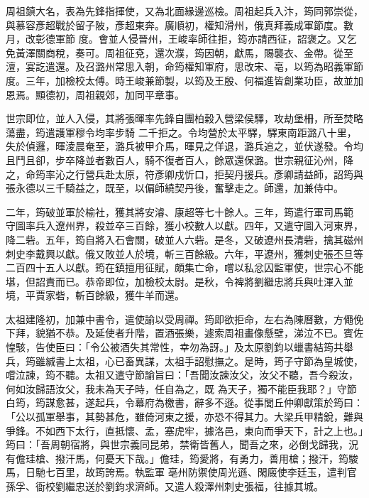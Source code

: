 \begin{pinyinscope}
 周祖鎮大名，表為先鋒指揮使，又為北面緣邊巡檢。周祖起兵入汴，筠同郭崇從，與慕容彥超戰於留子陂，彥超東奔。廣順初，權知滑州，俄真拜義成軍節度。數月，改彰德軍節
 度。會並人侵晉州，王峻率師往拒，筠亦請西征，詔褒之。又乞免黃澤關商稅，奏可。周祖征兗，還次濮，筠因朝，獻馬，賜襲衣、金帶。從至澶，宴訖遣還。及召潞州常思入朝，命筠權知軍府，思改宋、亳，以筠為昭義軍節度。三年，加檢校太傅。時王峻兼節製，以筠及王殷、何福進皆創業功臣，故並加恩焉。顯德初，周祖親郊，加同平章事。



 世宗即位，並人入侵，其將張暉率先鋒自團柏穀入營梁侯驛，攻劫堡柵，所至焚略蕩盡，筠遣護軍穆令均率步騎
 二千拒之。令均營於太平驛，驛東南距潞八十里，失於偵邏，暉淩晨奄至，潞兵被甲介馬，暉見之佯退，潞兵追之，並伏遂發。令均且鬥且卻，步卒降並者數百人，騎不復者百人，餘眾還保潞。世宗親征沁州，降之，命筠率沁之行營兵赴太原，符彥卿戍忻口，拒契丹援兵。彥卿請益師，詔筠與張永德以三千騎益之，既至，以偏師繞契丹後，奮擊走之。師還，加兼侍中。



 二年，筠破並軍於榆社，獲其將安濬、康超等七十餘人。三年，筠遣行軍司馬範
 守圖率兵入遼州界，殺並卒三百餘，獲小校數人以獻。四年，又遣守圖入河東界，降二砦。五年，筠自將入石會關，破並人六砦。是冬，又破遼州長清砦，擒其磁州刺史李戴興以獻。俄又敗並人於境，斬三百餘級。六年，平遼州，獲刺史張丕旦等二百四十五人以獻。筠在鎮擅用征賦，頗集亡命，嚐以私忿囚監軍使，世宗心不能堪，但詔責而已。恭帝即位，加檢校太尉。是秋，令裨將劉繼忠將兵與吐渾入並境，平賈家砦，斬百餘級，獲牛羊而還。



 太祖建隆初，加兼中書令，遣使諭以受周禪。筠即欲拒命，左右為陳曆數，方僶俛下拜，貌猶不恭。及延使者升階，置酒張樂，遽索周祖畫像懸壁，涕泣不已。賓佐惶駭，告使臣曰：「令公被酒失其常性，幸勿為訝。」及太原劉鈞以蠟書結筠共舉兵，筠雖緘書上太祖，心已畜異謀，太祖手詔慰撫之。是時，筠子守節為皇城使，嚐泣諫，筠不聽。太祖又遣守節諭旨曰：「吾聞汝諫汝父，汝父不聽，吾今殺汝，何如汝歸語汝父，我未為天子時，任自為之，既
 為天子，獨不能臣我耶？」守節白筠，筠謀愈甚，遂起兵，令幕府為檄書，辭多不遜。從事閭丘仲卿獻策於筠曰：「公以孤軍舉事，其勢甚危，雖倚河東之援，亦恐不得其力。大梁兵甲精銳，難與爭鋒。不如西下太行，直抵懷、孟，塞虎牢，據洛邑，東向而爭天下，計之上也。」筠曰：「吾周朝宿將，與世宗義同昆弟，禁衛皆舊人，聞吾之來，必倒戈歸我，況有儋珪槍、撥汗馬，何憂天下哉。」儋珪，筠愛將，有勇力，善用槍；撥汗，筠駿馬，日馳七百里，故筠誇焉。執監軍
 亳州防禦使周光遜、閑廄使李廷玉，遣判官孫孚、衙校劉繼忠送於劉鈞求濟師。又遣人殺澤州刺史張福，往據其城。




\end{pinyinscope}
